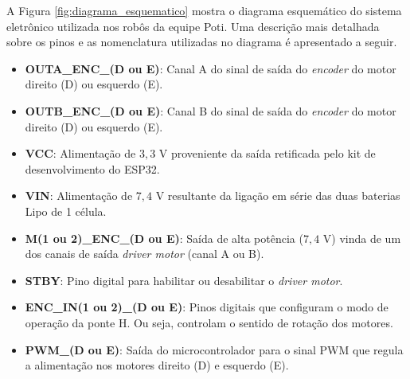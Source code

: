 A Figura \ref{fig:diagrama_esquematico} mostra o diagrama esquemático do sistema eletrônico utilizada nos robôs da equipe Poti. Uma descrição mais detalhada sobre os pinos e as nomenclatura utilizadas no diagrama é apresentado a seguir. 

\begin{itemize}
    \item \textbf{OUTA\_ENC\_(D ou E)}: Canal A do sinal de saída do \emph{encoder} do motor direito (D) ou esquerdo (E).
    \item \textbf{OUTB\_ENC\_(D ou E)}: Canal B do sinal de saída do \emph{encoder} do motor direito (D) ou esquerdo (E).
    \item \textbf{VCC}: Alimentação de $3,3$ V proveniente da saída retificada pelo kit de desenvolvimento do ESP32.
    \item \textbf{VIN}: Alimentação de $7,4$ V resultante da ligação em série das duas baterias Lipo de 1 célula.
    \item \textbf{M(1 ou 2)\_ENC\_(D ou E)}: Saída de alta potência ($7,4$ V) vinda de um dos canais de saída \emph{driver motor} (canal A ou B).
    \item \textbf{STBY}: Pino digital para habilitar ou desabilitar o \emph{driver motor}.
    \item \textbf{ENC\_IN(1 ou 2)\_(D ou E)}: Pinos digitais que configuram o modo de operação da ponte H. Ou seja, controlam o sentido de rotação dos motores.
    \item \textbf{PWM\_(D ou E)}: Saída do microcontrolador para o sinal PWM que regula a alimentação nos motores direito (D) e esquerdo (E).
\end{itemize}

